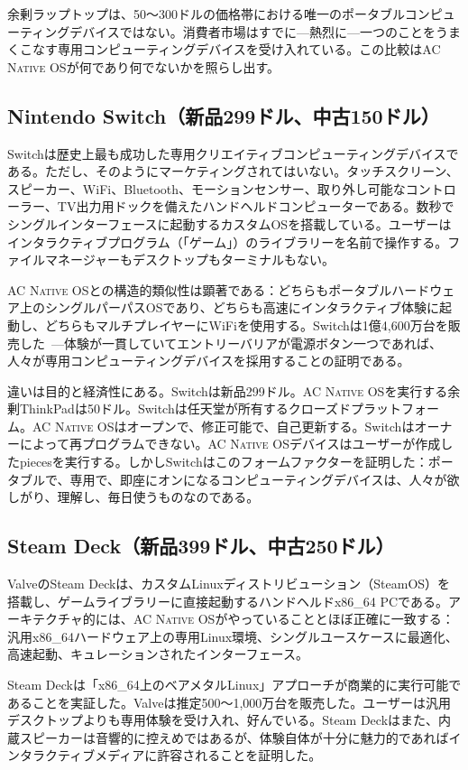 \documentclass[10pt,letterpaper,twocolumn]{article}
\newcommand{\acos}{\textsc{AC Native OS}}
\begin{document}
余剰ラップトップは、50〜300ドルの価格帯における唯一のポータブルコンピューティングデバイスではない。消費者市場はすでに---熱烈に---一つのことをうまくこなす専用コンピューティングデバイスを受け入れている。この比較は\acos{}が何であり何でないかを照らし出す。

\subsection{Nintendo Switch（新品299ドル、中古150ドル）}

Switchは歴史上最も成功した専用クリエイティブコンピューティングデバイスである。ただし、そのようにマーケティングされてはいない。タッチスクリーン、スピーカー、WiFi、Bluetooth、モーションセンサー、取り外し可能なコントローラー、TV出力用ドックを備えたハンドヘルドコンピューターである。数秒でシングルインターフェースに起動するカスタムOSを搭載している。ユーザーはインタラクティブプログラム（「ゲーム」）のライブラリーを名前で操作する。ファイルマネージャーもデスクトップもターミナルもない。

\acos{}との構造的類似性は顕著である：どちらもポータブルハードウェア上のシングルパーパスOSであり、どちらも高速にインタラクティブ体験に起動し、どちらもマルチプレイヤーにWiFiを使用する。Switchは1億4,600万台を販売した~\citep{nintendo2024earnings}---体験が一貫していてエントリーバリアが電源ボタン一つであれば、人々が専用コンピューティングデバイスを採用することの証明である。

違いは目的と経済性にある。Switchは新品299ドル。\acos{}を実行する余剰ThinkPadは50ドル。Switchは任天堂が所有するクローズドプラットフォーム。\acos{}はオープンで、修正可能で、自己更新する。Switchはオーナーによって再プログラムできない。\acos{}デバイスはユーザーが作成したpiecesを実行する。しかしSwitchはこのフォームファクターを証明した：ポータブルで、専用で、即座にオンになるコンピューティングデバイスは、人々が欲しがり、理解し、毎日使うものなのである。

\subsection{Steam Deck（新品399ドル、中古250ドル）}

ValveのSteam Deckは、カスタムLinuxディストリビューション（SteamOS）を搭載し、ゲームライブラリーに直接起動するハンドヘルドx86\_64 PCである。アーキテクチャ的には、\acos{}がやっていることとほぼ正確に一致する：汎用x86\_64ハードウェア上の専用Linux環境、シングルユースケースに最適化、高速起動、キュレーションされたインターフェース。

Steam Deckは「x86\_64上のベアメタルLinux」アプローチが商業的に実行可能であることを実証した。Valveは推定500〜1,000万台を販売した。ユーザーは汎用デスクトップよりも専用体験を受け入れ、好んでいる。Steam Deckはまた、内蔵スピーカーは音響的に控えめではあるが、体験自体が十分に魅力的であればインタラクティブメディアに許容されることを証明した。
\end{document}
